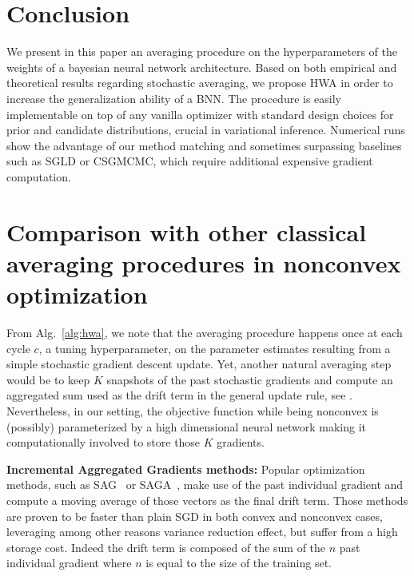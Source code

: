 \documentclass[tablecaption=bottom,wcp]{jmlr}
\begin{document}
\section{Conclusion}\label{sec:conclusion}
We present in this paper an averaging procedure on the hyperparameters of the weights of a bayesian neural network architecture.
Based on both empirical and theoretical results regarding stochastic averaging, we propose HWA in order to increase the generalization ability of a BNN.
The procedure is easily implementable on top of any vanilla optimizer with standard design choices for prior and candidate distributions, crucial in variational inference.
Numerical runs show the advantage of our method matching and sometimes surpassing baselines such as SGLD or CSGMCMC, which require additional expensive gradient computation.


\clearpage



\clearpage
\appendix

  \hsize\textwidth
  \linewidth\hsize {}
 \bottomtitlebar 
 
\section{Comparison with other classical averaging procedures in nonconvex optimization}
From Alg.~\ref{alg:hwa}, we note that the averaging procedure happens once at each cycle $c$, a tuning hyperparameter, on the parameter estimates resulting from a simple stochastic gradient descent update.
Yet, another natural averaging step would be to keep $K$ snapshots of the past stochastic gradients and compute an aggregated sum used as the drift term in the general update rule, see \citep{zhou2017convergence}.
Nevertheless, in our setting, the objective function while being nonconvex is (possibly) parameterized by a high dimensional neural network making it computationally involved to store those $K$ gradients.


\textbf{Incremental Aggregated Gradients methods:} Popular optimization methods, such as SAG~\citep{schmidt2017minimizing} or SAGA~\citep{defazio2014saga}, make use of the past individual gradient and compute a moving average of those vectors as the final drift term. Those methods are proven to be faster than plain SGD in both convex and nonconvex cases, leveraging among other reasons variance reduction effect, but suffer from a high storage cost. Indeed the drift term is composed of the sum of the $n$ past individual gradient where $n$ is equal to the size of the training set.
\end{document}
